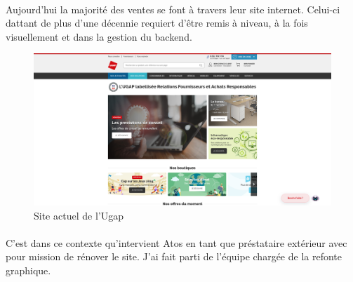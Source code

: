 \documentclass[12pt]{article}
\begin{document}
\begin {sloppypar}
\paragraph{}
Aujourd'hui la majorité des ventes se font à travers leur site internet. Celui-ci dattant de plus d'une décennie 
requiert d'être remis à niveau, à la fois visuellement et dans la gestion du backend. 
\newpage
\begin{figure}
  \includegraphics[width=\textwidth] {sc_ugap.png}
  \caption {Site actuel de l'Ugap}
\end{figure}
\paragraph{}
C'est dans ce contexte qu'intervient Atos en tant que préstataire extérieur avec pour mission de 
rénover le site. J'ai fait parti de l'équipe chargée de la refonte graphique. 

\end{sloppypar}
\end{document}
